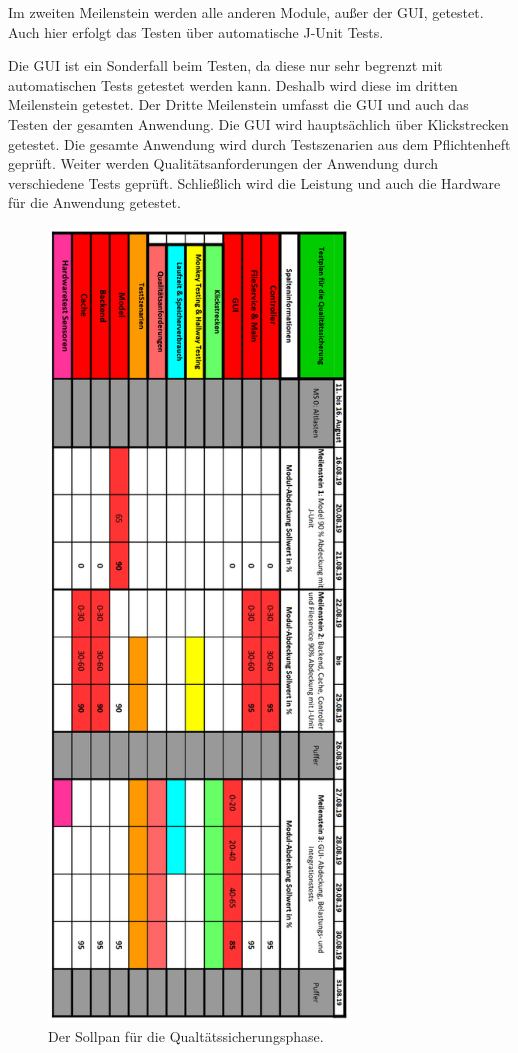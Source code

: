 \documentclass[parskip=full]{scrartcl}
\begin{document}
Im zweiten Meilenstein werden alle anderen Module, außer der GUI, getestet. Auch hier erfolgt das Testen über automatische J-Unit Tests.

Die GUI ist ein Sonderfall beim Testen, da diese nur sehr begrenzt mit automatischen Tests getestet werden kann. Deshalb wird diese im dritten Meilenstein getestet. Der Dritte Meilenstein umfasst die GUI und auch das Testen der gesamten Anwendung. Die GUI wird hauptsächlich über Klickstrecken getestet. Die gesamte Anwendung wird durch Testszenarien aus dem Pflichtenheft geprüft. Weiter werden Qualitätsanforderungen der Anwendung durch verschiedene Tests geprüft. Schließlich wird die Leistung und auch die Hardware für die Anwendung getestet. 

\begin{figure}[htbp]
	\begin{center}
		\includegraphics[width = 8cm]{Grafiken/sollplan.png}
		\caption{Der Sollpan für die Qualtätssicherungsphase.}
		\label{sollplan}
	\end{center}
\end{figure}
\end{document}
